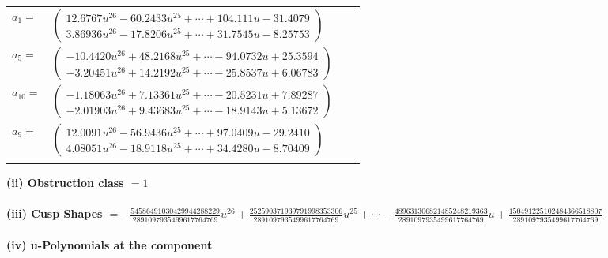\documentclass[1p]{elsarticle_modified}
\theoremstyle{definition}
\begin{document}
\begin{tabular}{m{7pt} m{180pt} m{7pt} m{180pt} }
\flushright $a_{1}=$&$\begin{pmatrix}12.6767 u^{26}-60.2433 u^{25}+\cdots+104.111 u-31.4079\\3.86936 u^{26}-17.8206 u^{25}+\cdots+31.7545 u-8.25753\end{pmatrix}$ \\
\flushright $a_{5}=$&$\begin{pmatrix}-10.4420 u^{26}+48.2168 u^{25}+\cdots-94.0732 u+25.3594\\-3.20451 u^{26}+14.2192 u^{25}+\cdots-25.8537 u+6.06783\end{pmatrix}$ \\
\flushright $a_{10}=$&$\begin{pmatrix}-1.18063 u^{26}+7.13361 u^{25}+\cdots-20.5231 u+7.89287\\-2.01903 u^{26}+9.43683 u^{25}+\cdots-18.9143 u+5.13672\end{pmatrix}$ \\
\flushright $a_{9}=$&$\begin{pmatrix}12.0091 u^{26}-56.9436 u^{25}+\cdots+97.0409 u-29.2410\\4.08051 u^{26}-18.9118 u^{25}+\cdots+34.4280 u-8.70409\end{pmatrix}$\\&\end{tabular}
\flushleft \textbf{(ii) Obstruction class $= 1$}\\~\\
\flushleft \textbf{(iii) Cusp Shapes $= -\frac{54586491030429944288229}{2891097935499617764769} u^{26}+\frac{252590371939791998353306}{2891097935499617764769} u^{25}+\cdots-\frac{489631306821485248219363}{2891097935499617764769} u+\frac{150491225102484366518807}{2891097935499617764769}$}\\~\\
\newpage\renewcommand{\arraystretch}{1}
\flushleft \textbf{(iv) u-Polynomials at the component}\newline \\
\end{document}

